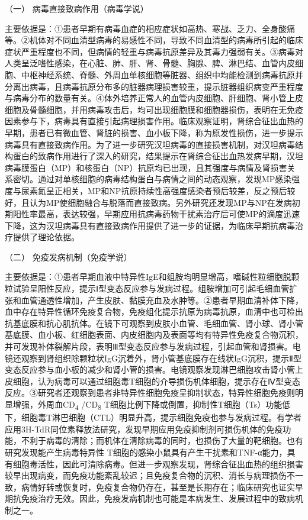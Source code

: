 \hypertarget{text00223.htmlux5cux23CHP7-7-1-2-1}{}
（一） 病毒直接致病作用（病毒学说）

主要依据是：①患者早期有病毒血症的相应症状如高热、寒战、乏力、全身酸痛等。②机体对不同血清型病毒的易感性不同，导致不同血清型的病毒所引起的临床症状严重程度也不同，但病情的轻重与病毒抗原差异及其毒力强弱有关。③病毒对人类呈泛嗜性感染，在心脏、肺、肝、肾、骨髓、胸腺、脾、淋巴结、血管内皮细胞、中枢神经系统、脊髓、外周血单核细胞等脏器、组织中均能检测到病毒抗原并分离出病毒，且病毒抗原分布多的脏器病理损害较重，提示脏器组织病变严重程度与病毒分布的数量有关。④体外培养正常人的血管内皮细胞、肝细胞、肾小管上皮细胞及骨髓细胞，并用病毒攻击后，均可出现细胞膜和细胞器损伤，表明在无免疫因素参与下，病毒具有直接引起病理损害作用。临床观察证明，肾综合征出血热的早期，患者已有微血管、肾脏的损害、血小板下降，称为原发性损伤，进一步提示病毒具有直接致病作用。为了进一步研究汉坦病毒的直接损害机制，对汉坦病毒结构蛋白的致病作用进行了深入的研究，结果提示在肾综合征出血热发病早期，汉坦病毒膜蛋白（MP）和核蛋白（NP）抗原均已出现，且其强度与病情及肾损害关系密切。通过对单核细胞的病毒结构蛋白与病情之间的动态观察，发现MP感染强度与尿素氮呈正相关，MP和NP抗原持续性高强度感染者预后较差，反之预后较好，且认为MP使细胞融合与脱落而直接致病。另外研究还发现MP与NP在发病初期阳性率最高，表达较强，早期应用抗病毒药物干扰素治疗后可使MP的滴度迅速下降，这为汉坦病毒具有直接致病作用提供了进一步的证据，为临床早期抗病毒治疗提供了理论依据。

\hypertarget{text00223.htmlux5cux23CHP7-7-1-2-2}{}
（二） 免疫发病机制（免疫学说）

主要依据是：①患者早期血液中特异性IgE和组胺均明显增高，嗜碱性粒细胞脱颗粒试验呈阳性反应，提示Ⅰ型变态反应参与发病过程。组胺增加可引起毛细血管扩张和血管通透性增加，产生皮肤、黏膜充血及水肿等。②患者早期血清补体下降，血中存在特异性循环免疫复合物，免疫组化提示抗原为病毒抗原，血清中也可检出抗基底膜和抗心肌抗体。在镜下可观察到皮肤小血管、毛细血管、肾小球、肾小管基底膜、血小板、红细胞表面、内皮细胞内及表面等均有特异性免疫复合物沉积，并可发现补体裂解片段，表明Ⅲ型变态反应参与发病过程，引起血管和肾损害。电镜还观察到肾组织除颗粒状IgG沉着外，肾小管基底膜存在线状IgG沉积，提示Ⅱ型变态反应参与血小板的减少和肾小管的损害。电镜观察发现淋巴细胞攻击肾小管上皮细胞，认为病毒可以通过细胞毒T细胞的介导损伤机体细胞，提示存在Ⅳ型变态反应。③研究者还观察到患者非特异性细胞免疫呈抑制状态，特异性细胞免疫则明显增强，外周血CD\textsubscript{4}
/CD\textsubscript{8}
T细胞比例下降或倒置，抑制性T细胞（Ts）功能低下，细胞毒T淋巴细胞（CTL）明显升高，提示细胞免疫也参与发病过程。有学者应用3H-TdR同位素释放法研究，发现早期应用免疫抑制剂可损伤机体的免疫功能，不利于病毒的清除；而机体在清除病毒的同时，也损伤了大量的靶细胞。也有研究发现能产生病毒特异性{}
T细胞的感染小鼠具有产生干扰素和TNF-α能力，具有细胞毒活性，因此可清除病毒。但进一步观察发现，肾综合征出血热的组织损害较早出现病变，而免疫功能紊乱较迟；且免疫复合物的沉积、消长与病理损伤不一致，病情好转或恢复时，免疫复合物仍存在，甚至是长期存在；临床研究也证实早期抗免疫治疗无效。因此，免疫发病机制也可能是本病发生、发展过程中的致病机制之一。

